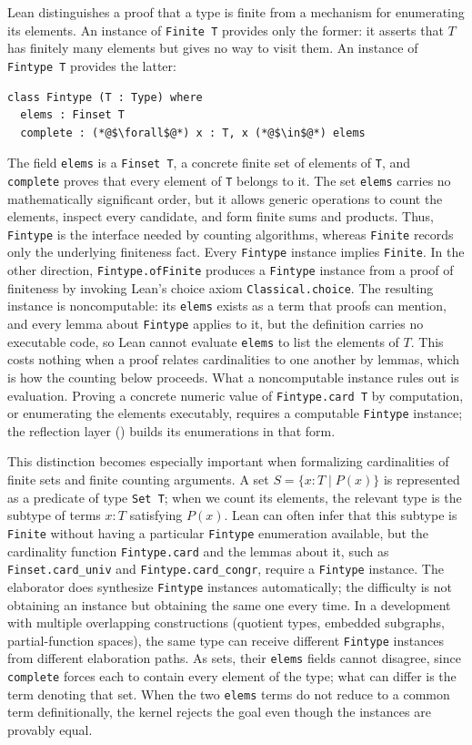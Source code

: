 \documentclass{article}
\newcommand{\lean}[1]{\texttt{#1}}
\begin{document}
Lean distinguishes a proof that a type is finite from a mechanism for
enumerating its elements.  An instance of \lean{Finite T} provides only the
former: it asserts that $T$ has finitely many elements but gives no way to
visit them.  An instance of \lean{Fintype T} provides the latter:
\begin{lstlisting}
class Fintype (T : Type) where
  elems : Finset T
  complete : (*@$\forall$@*) x : T, x (*@$\in$@*) elems
\end{lstlisting}
The field \lean{elems} is a \lean{Finset T}, a concrete finite set of
elements of \lean{T}, and \lean{complete} proves that every element of
\lean{T} belongs to it.  The set \lean{elems} carries no mathematically
significant order, but it allows generic operations to count the elements,
inspect every candidate, and form finite sums and products.  Thus,
\lean{Fintype} is the interface needed by counting algorithms,
whereas \lean{Finite} records only the underlying finiteness fact.  Every
\lean{Fintype} instance implies \lean{Finite}.  In the other direction,
\lean{Fintype.ofFinite} produces a \lean{Fintype} instance from a proof of
finiteness by invoking Lean's choice axiom \lean{Classical.choice}.  The
resulting instance is noncomputable: its \lean{elems} exists as a term that
proofs can mention, and every lemma about \lean{Fintype} applies to it, but
the definition carries no executable code, so Lean cannot evaluate
\lean{elems} to list the elements of $T$.  This costs nothing when a proof relates cardinalities to one another by
lemmas, which is how the counting below proceeds.  What a noncomputable
instance rules out is evaluation.  Proving a concrete numeric value of
\lean{Fintype.card T} by computation, or enumerating the elements
executably, requires a computable \lean{Fintype} instance; the reflection
layer () builds its enumerations in that form.

This distinction becomes especially important when formalizing cardinalities of finite sets
and finite counting arguments.  A set $S=\{x:T\mid P(x)\}$ is represented as a
predicate of type \lean{Set T}; when
we count its elements, the relevant type is the subtype of terms $x:T$
satisfying $P(x)$.  Lean can often infer that this subtype is \lean{Finite}
without having a particular \lean{Fintype} enumeration available, but the
cardinality function \lean{Fintype.card} and the lemmas about it, such as
\lean{Finset.card\_univ} and \lean{Fintype.card\_congr}, require a
\lean{Fintype} instance.  The elaborator does synthesize \lean{Fintype}
instances automatically; the difficulty is not obtaining an instance but
obtaining the same one every time.  In a development with multiple
overlapping constructions (quotient types, embedded subgraphs,
partial-function spaces), the same type can receive different \lean{Fintype}
instances from different elaboration paths.  As sets, their \lean{elems}
fields cannot disagree, since \lean{complete} forces each to contain every
element of the type; what can differ is the term denoting that set.  When
the two \lean{elems} terms do not reduce to a common term definitionally,
the kernel rejects the goal even though the instances are provably equal.
\end{document}
